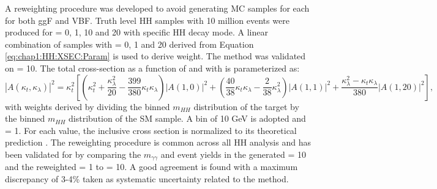 A reweighting procedure was developed to avoid generating MC samples for each \kl for both ggF and VBF. Truth level HH samples with 10 million events were produced for \kl= 0, 1, 10 and 20 with specific HH decay mode. A linear combination of samples with \kl= 0, 1 and 20 derived from Equation \ref{eq:chap1:HH:XSEC:Param} is used to derive weight. The method was validated on \kl= 10. The total cross-section as a function of \kl and \kt with is parameterized as:
\begin{equation}
    \left|A\left(\kappa_{t}, \kappa_{\lambda}\right)\right|^{2}=\kappa_{t}^{2}\left[\left(\kappa_{t}^{2}+\frac{\kappa_{\lambda}^{2}}{20}-\frac{399}{380} \kappa_{t} \kappa_{\lambda}\right)|A(1,0)|^{2}+\left(\frac{40}{38} \kappa_{t} \kappa_{\lambda}-\frac{2}{38} \kappa_{\lambda}^{2}\right)|A(1,1)|^{2}+\frac{\kappa_{\lambda}^{2}-\kappa_{t} \kappa_{\lambda}}{380}|A(1,20)|^{2}\right],
\end{equation}
with weights derived by dividing the binned $m_{HH}$ distribution of the target \kl by the binned $m_{HH}$ distribution of the SM sample. A bin of 10 GeV is adopted and \kt= 1. For each \kl value, the inclusive cross section is normalized to its theoretical prediction \cite{LHE}. The reweighting procedure is common across all HH analysis and has been validated for \HHyybb by comparing the $m_{\gamma\gamma}$ and event yields in the generated \kl= 10 and the reweighted \kl= 1 to \kl= 10. A good agreement is found with a maximum discrepancy of 3-4\% taken as systematic uncertainty related to the method.  \\ 

